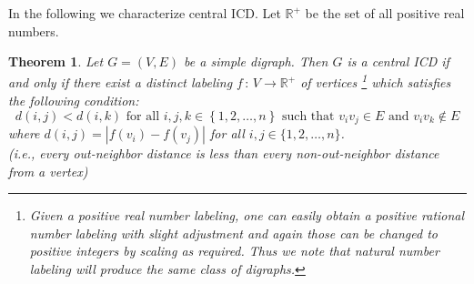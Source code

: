 \documentclass{article}
\newtheorem{thm}{Theorem}[section]
\theoremstyle{definition}
\numberwithin{equation}{section}
\newcommand{\To}{\longrightarrow}
\newcommand{\Map}[3]{#1\, :\, #2\To #3}
\newcommand{\Real}{\mathbb{R}}
\newcommand{\set}[1]{\left\{#1\right\}}
\begin{document}
\noindent 
In the following we characterize central ICD. Let $\Real^+$ be the set of all positive real numbers.

\begin{thm}\label{cicdop}
Let $G=(V,E)$ be a simple digraph. Then $G$ is a central ICD if and only if there exist a distinct  
labeling $\Map{f}{V}{\Real^+}$ of vertices \footnote{Given a positive real number labeling, one can easily obtain a positive rational number labeling with slight adjustment and again those can be changed to positive integers by scaling as required. Thus we note that natural number labeling will produce the same class of digraphs.} which satisfies the following condition:
\begin{equation}\label{cicd1}
d(i,j)<d(i,k)\text{ for all }i,j,k\in\set{1,2,\ldots,n}\text{ such that }v_iv_j\in E\text{ and }v_iv_k\not\in E
\end{equation}
where $d(i,j)=|f(v_{i})-f(v_{j})|$ for all $i,j\in\{1,2,\hdots,n\}$.\\
(i.e., every out-neighbor distance is less than every non-out-neighbor distance from a vertex)

\end{thm}
\end{document}
